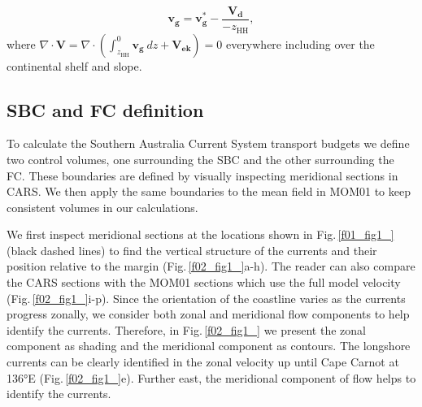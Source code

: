 \documentclass[preprint,3p,review,12pt]{elsarticle}
\renewcommand{\Vec}[1]{\mathbf{#1}}
\newcommand{\sub}[1]{_{\text{#1}}}
\begin{document}
\begin{equation}
\Vec{v\sub{g}} = \Vec{v\sub{g}^{*}} - \frac{\Vec{V\sub{d}}}{-z\sub{HH}},
\end{equation}
%
where $\nabla\cdot\Vec{V}=\nabla\cdot(\int_{z\sub{HH}}^{0}\Vec{v\sub{g}}\ dz + \Vec{V\sub{ek}})=0$ everywhere including over the continental shelf and slope.

\subsection{SBC and FC definition} \label{SBC and FC definition}
To calculate the Southern Australia Current System transport budgets we define two control volumes, one surrounding the SBC and the other surrounding the FC\@. These boundaries are defined by visually inspecting meridional sections in CARS. We then apply the same boundaries to the mean field in MOM01 to keep consistent volumes in our calculations. 

We first inspect meridional sections at the locations shown in Fig.\,\ref{f01_fig1_} (black dashed lines) to find the vertical structure of the currents and their position relative to the margin (Fig.\,\ref{f02_fig1_}a-h). The reader can also compare the CARS sections with the MOM01 sections which use the full model velocity (Fig.\,\ref{f02_fig1_}i-p). Since the orientation of the coastline varies as the currents progress zonally, we consider both zonal and meridional flow components to help identify the currents. Therefore, in Fig.\,\ref{f02_fig1_} we present the zonal component as shading and the meridional component as contours. The longshore currents can be clearly identified in the zonal velocity up until Cape Carnot at \ang{136}E (Fig.\,\ref{f02_fig1_}e). Further east, the meridional component of flow helps to identify the currents.
\end{document}
